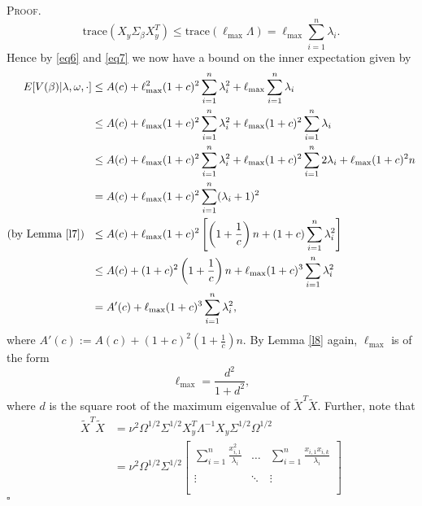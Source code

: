 \documentclass[12pt]{article}
\newcounter{ProofCounter}
\newenvironment{Proof}{\stepcounter{ProofCounter}\textsc{Proof.}}{\hfill$\square$}
\numberwithin{equation}{section}
\begin{document}
\begin{Proof}
  \begin{equation}
    \text{trace}(X_y \Sigma_\beta X_{y}^T) \leq \text{trace}(\ell_{\max} \Lambda) = \ell_{\max} \sum_{i=1}^{n} \lambda_i.
    \label{eq7}
  \end{equation}
  Hence by \eqref{eq6} and \eqref{eq7} we now have a bound on the inner expectation given by 
  \begin{align}
    E[V(\beta) | \lambda, \omega, \cdot] & \leq A(c) + \ell_{\max}^2(1 + c)^2 \sum_{i=1}^{n} \lambda_i^2 + \ell_{\max} \sum_{i=1}^{n} \lambda_i
    \nonumber \\
    & \leq A(c) + \ell_{\max}(1 + c)^2 \sum_{i=1}^{n}\lambda_i^2 + \ell_{\max}(1 + c)^2 \sum_{i=1}^{n}\lambda_i \nonumber \\
    & \leq A(c) + \ell_{\max}(1 + c)^2 \sum_{i=1}^{n}\lambda_i^2 + \ell_{\max}(1 + c)^2 \sum_{i=1}^{n}2\lambda_i  + \ell_{\max}(1 + c)^2 n \nonumber \\
    & = A(c) + \ell_{\max}(1 + c)^2 \sum_{i=1}^{n}(\lambda_i + 1)^2 \nonumber \\
    \text{(by Lemma \ref{l7}) } \ & \leq A(c) + \ell_{\max}(1 + c)^2 \left[ \left( 1 + \frac{1}{c} \right)n + (1 + c)\sum_{i=1}^{n}\lambda_i^2 \right] \nonumber \\
    & \leq A(c) + (1 + c)^2\left( 1 + \frac{1}{c} \right)n + \ell_{\max}(1 + c)^3 \sum_{i=1}^{n} \lambda_i^2 \nonumber \\
    & = A'(c) + \ell_{\max}(1 + c)^3 \sum_{i=1}^{n} \lambda_i^2,
    \label{eq9}
  \end{align}
  where $A'(c) := A(c) + (1 + c)^2\left( 1 + \frac{1}{c} \right)n$. By Lemma \ref{l8} again, $\ell_{\max}$ is of the form 
  \begin{equation}
    \ell_{\max} = \frac{d^2}{1 + d^2}, 
    \label{eq10}
  \end{equation}
  where $d$ is the square root of the maximum eigenvalue of $\tilde{X}^T
  \tilde{X}$. Further, note that 
  \begin{align*}
    \tilde{X}^T \tilde{X} & = \nu^{2} \Omega^{1/2}\Sigma^{1/2} X_y^T \Lambda^{-1} X_y \Sigma^{1/2}\Omega^{1/2} \\
    & = \nu^{2} \Omega^{1/2}\Sigma^{1/2} \begin{bmatrix}
      \sum_{i=1}^{n}\frac{x_{i,1}^2}{\lambda_i} & \dots & \sum_{i=1}^{n}\frac{ x_{i,1}x_{i,k}}{\lambda_i} \\
      \\
      \vdots & \ddots & \vdots \\
      \\

\end{bmatrix}
\end{align*}
\end{Proof}
\end{document}
